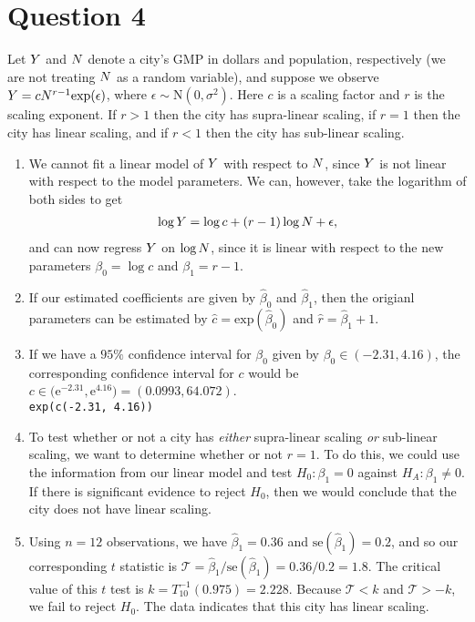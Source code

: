 \documentclass[10pt]{article}
\begin{document}
\section{Question 4} \noindent
Let \(Y\) and \(N\) denote a city's GMP in dollars and population, respectively (we are not treating \(N\) as a random variable), and suppose we observe 
\(Y = c N^{r - 1} \mathrm{exp}(\epsilon)\), where \(\epsilon \sim \mathrm{N}(0, \sigma^2)\). Here \(c\) is a scaling factor and \(r\) is the scaling exponent. 
If \(r > 1\) then the city has supra-linear scaling, if \(r = 1\) then the city has linear scaling, and if \(r < 1\) then the city has sub-linear scaling. 
\begin{enumerate}
    \item We cannot fit a linear model of \(Y\) with respect to \(N\), since \(Y\) is not linear with respect to the model parameters. We can, however,
    take the logarithm of both sides to get 
    \begin{align}
        \log Y
        = \log c + (r - 1) \log N + \epsilon,
    \end{align}
    and can now regress \(Y\) on \(\log N\), since it is linear with respect to the new parameters \(\beta_0 = \log c\) and \(\beta_1 = r - 1\).
    \item If our estimated coefficients are given by \(\hat{\beta}_0\) and \(\hat{\beta}_1\), then the origianl parameters can be estimated by 
    \(\hat{c} = \mathrm{exp}(\hat{\beta}_0)\) and \(\hat{r} = \hat{\beta}_1 + 1\). 
    \item If we have a \(95\%{}\) confidence interval for \(\beta_0\) given by \(\beta_0 \in (-2.31, 4.16)\), the corresponding confidence interval for \(c\) would be 
    \(c \in \big( \mathrm{e}^{-2.31}, \mathrm{e}^{4.16} \big) = (0.0993, 64.072)\). \\[0.5em]
    \texttt{exp(c(-2.31, 4.16))}
    \item To test whether or not a city has \textsl{either} supra-linear scaling \textsl{or} sub-linear scaling, we want to determine whether or not \(r = 1\). 
    To do this, we could use the information from our linear model and test \(H_0 : \beta_1 = 0\) against \(H_A : \beta_1 \neq 0\). If there is significant evidence to 
    reject \(H_0\), then we would conclude that the city does not have linear scaling. 
    \item Using \(n = 12\) observations, we have \(\hat{\beta}_1 = 0.36\) and \(\mathrm{se}(\hat{\beta}_1) = 0.2\), and so our corresponding \(t\) statistic is 
    \(\mathcal{T} = \hat{\beta}_1 / \mathrm{se}(\hat{\beta}_1) = 0.36 / 0.2 = 1.8\). The critical value of this \(t\) test is 
    \(k = T_{10}^{-1}(0.975) = 2.228\). Because \(\mathcal{T} < k\) and \(\mathcal{T} > -k\), we fail to reject \(H_0\). The data indicates that this city has 
    linear scaling. 
\end{enumerate}
\end{document}
